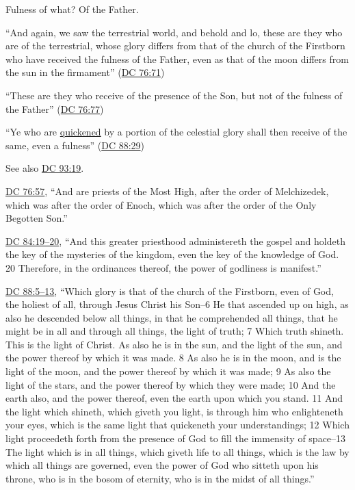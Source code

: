\begin{compactitem}
\begin{compactitem}
						\begin{compactitem}
							\item Fulness of what? Of the Father.
							\item ``And again, we saw the terrestrial world, and behold and lo, these are they who are of the terrestrial, whose glory differs from that of the church of the Firstborn who have received the fulness of the Father, even as that of the moon differs from the sun in the firmament'' (\hyperref[DC76-71]{DC 76:71})
							\item ``These are they who receive of the presence of the Son, but not of the fulness of the Father'' (\hyperref[DC76-77]{DC 76:77})
							\item ``Ye who are \hyperref[QUICKEN]{quickened} by a portion of the celestial glory shall then receive of the same, even a fulness'' (\hyperref[DC88-29]{DC 88:29})
							\item See also \hyperref[DC93-19]{DC 93:19}.
						\end{compactitem}
					\item \hyperref[DC76-57]{DC 76:57}, ``And are priests of the Most High, after the order of Melchizedek, which was after the order of Enoch, which was after the order of the Only Begotten Son.''
					\item \hyperref[DC84-19]{DC 84:19--20}, ``And this greater priesthood administereth the gospel and holdeth the key of the mysteries of the kingdom, even the key of the knowledge of God. 20 Therefore, in the ordinances thereof, the power of godliness is manifest.''
					\item \hyperref[DC88-5]{DC 88:5--13}, ``Which glory is that of the church of the Firstborn, even of God, the holiest of all, through Jesus Christ his Son--6 He that ascended up on high, as also he descended below all things, in that he comprehended all things, that he might be in all and through all things, the light of truth; 7 Which truth shineth. This is the light of Christ. As also he is in the sun, and the light of the sun, and the power thereof by which it was made. 8 As also he is in the moon, and is the light of the moon, and the power thereof by which it was made; 9 As also the light of the stars, and the power thereof by which they were made; 10 And the earth also, and the power thereof, even the earth upon which you stand. 11 And the light which shineth, which giveth you light, is through him who enlighteneth your eyes, which is the same light that quickeneth your understandings; 12 Which light proceedeth forth from the presence of God to fill the immensity of space--13 The light which is in all things, which giveth life to all things, which is the law by which all things are governed, even the power of God who sitteth upon his throne, who is in the bosom of eternity, who is in the midst of all things.'' 

\end{compactitem}
\end{compactitem}
